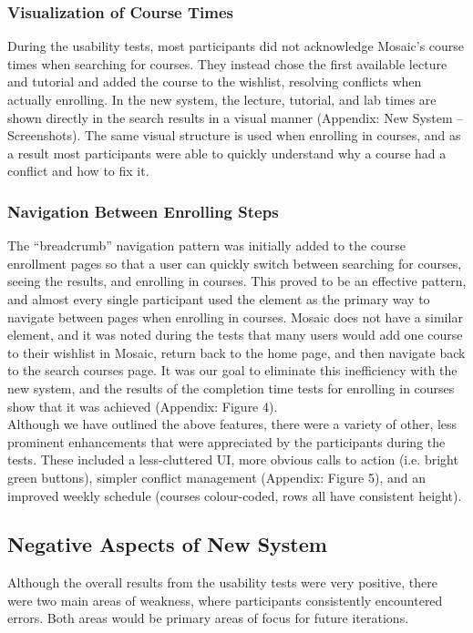 \documentclass[10pt]{article}
\begin{document}
\begin{multicols}{2}
\subsubsection*{Visualization of Course Times}
During the usability tests, most participants did not acknowledge Mosaic's course times when searching for courses. They instead chose the first available lecture and tutorial and added the course to the wishlist, resolving conflicts when actually enrolling. In the new system, the lecture, tutorial, and lab times are shown directly in the search results in a visual manner (Appendix: New System -- Screenshots). The same visual structure is used when enrolling in courses, and as a result most participants were able to quickly understand why a course had a conflict and how to fix it.

\subsubsection*{Navigation Between Enrolling Steps}
The ``breadcrumb'' navigation pattern was initially added to the course enrollment pages so that a user can quickly switch between searching for courses, seeing the results, and enrolling in courses. This proved to be an effective pattern, and almost every single participant used the element as the primary way to navigate between pages when enrolling in courses. Mosaic does not have a similar element, and it was noted during the tests that many users would add one course to their wishlist in Mosaic, return back to the home page, and then navigate back to the search courses page. It was our goal to eliminate this inefficiency with the new system, and the results of the completion time tests for enrolling in courses show that it was achieved (Appendix: Figure 4).\\

Although we have outlined the above features, there were a variety of other, less prominent enhancements that were appreciated by the participants during the tests. These included a less-cluttered UI, more obvious calls to action (i.e. bright green buttons), simpler conflict management (Appendix: Figure 5), and an improved weekly schedule (courses colour-coded, rows all have consistent height).

\subsection*{Negative Aspects of New System}
Although the overall results from the usability tests were very positive, there were two main areas of weakness, where participants consistently encountered errors. Both areas would be primary areas of focus for future iterations.


\end{multicols}
\end{document}
